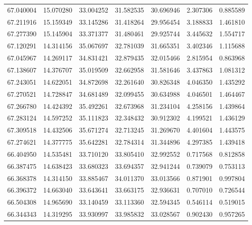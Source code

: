 \begin{tabular}{rrrrrrr}
 67.040004 &  15.070280 &         33.004252 &         31.582535 &         30.696946 &  2.307306 &  0.885589 \\
 67.211916 &  15.159349 &         33.145286 &         31.418264 &         29.956454 &  3.188833 &  1.461810 \\
 67.277390 &  15.145904 &         33.371377 &         31.480461 &         29.925744 &  3.445632 &  1.554717 \\
 67.120291 &  14.314156 &         35.067697 &         32.781039 &         31.665351 &  3.402346 &  1.115688 \\
 67.045967 &  14.269117 &         34.831421 &         32.879435 &         32.015466 &  2.815954 &  0.863968 \\
 67.138607 &  14.376707 &         35.019509 &         32.662958 &         31.581646 &  3.437863 &  1.081312 \\
 67.243051 &  14.622051 &         34.872698 &         32.261640 &         30.826348 &  4.046350 &  1.435292 \\
 67.270521 &  14.728847 &         34.681489 &         32.099455 &         30.634988 &  4.046501 &  1.464467 \\
 67.266780 &  14.424392 &         35.492261 &         32.673968 &         31.234104 &  4.258156 &  1.439864 \\
 67.283124 &  14.597252 &         35.111823 &         32.348432 &         30.912302 &  4.199521 &  1.436129 \\
 67.309518 &  14.432506 &         35.671274 &         32.713245 &         31.269670 &  4.401604 &  1.443575 \\
 67.274621 &  14.377775 &         35.642281 &         32.784314 &         31.344896 &  4.297385 &  1.439418 \\
 66.404950 &  14.535481 &         33.710120 &         33.805410 &         32.992552 &  0.717568 &  0.812858 \\
 66.387475 &  14.638423 &         33.680323 &         33.694357 &         32.941244 &  0.739079 &  0.753113 \\
 66.368378 &  14.314150 &         33.885467 &         34.011370 &         33.013566 &  0.871901 &  0.997804 \\
 66.396372 &  14.663040 &         33.643641 &         33.663175 &         32.936631 &  0.707010 &  0.726544 \\
 66.504308 &  14.965690 &         33.140459 &         33.113360 &         32.594345 &  0.546114 &  0.519015 \\
 66.344343 &  14.319295 &         33.930997 &         33.985832 &         33.028567 &  0.902430 &  0.957265 \\

\end{tabular}
